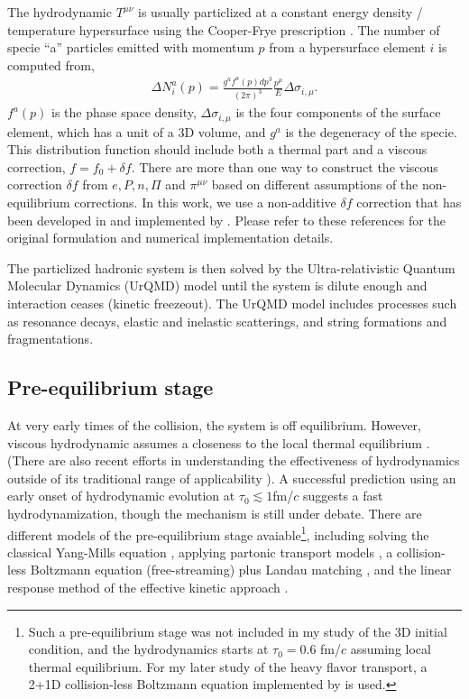 The hydrodynamic $T^{\mu\nu}$ is usually particlized at a constant energy density / temperature hypersurface using the Cooper-Frye prescription \cite{PhysRevD.10.186}.
The number of specie ``a'' particles emitted with momentum $p$ from a hypersurface element $i$ is computed from,
\begin{eqnarray}
\Delta N_i^a(p) = \frac{g^a f^a(p) dp^3}{(2\pi)^3}  \frac{p^{\mu}}{E} \Delta \sigma_{i,\mu}.
\end{eqnarray}
$f^a(p)$ is the phase space density, $\Delta \sigma_{i,\mu}$ is the four components of the surface element, which has a unit of a 3D volume, and $g^a$ is the degeneracy of the specie.
This distribution function should include both a thermal part and a viscous correction, $f = f_0 + \delta f$.
There are more than one way to construct the viscous correction $\delta f$  from $e, P, n, \Pi$ and $\pi^{\mu\nu}$ based on different assumptions of the non-equilibrium corrections.
In this work, we use a non-additive $\delta f$ correction that has been developed in \cite{Pratt:2010jt,Pratt:2014vja} and implemented by \cite{Bernhard:2018hnz}.
Please refer to these references for the original formulation and numerical implementation details.

The particlized hadronic system is then solved by the Ultra-relativistic Quantum Molecular Dynamics (UrQMD) model \cite{Bass:1998ca,Bleicher:1999xi} until the system is dilute enough and interaction ceases (kinetic freezeout). 
The UrQMD model includes processes such as resonance decays, elastic and inelastic scatterings, and string formations and fragmentations.

\subsection{Pre-equilibrium stage}
At very early times of the collision, the system is off equilibrium. 
However, viscous hydrodynamic assumes a closeness to the local thermal equilibrium . (There are also recent efforts in understanding the effectiveness of hydrodynamics outside of its traditional range of applicability \cite{PhysRevLett.115.072501,Romatschke:2017vte,Strickland:2019jut}).
A successful prediction using an early onset of hydrodynamic evolution at $\tau_0\lesssim 1$fm/$c$ suggests a fast hydrodynamization, though the mechanism is still under debate. 
There are different models of the pre-equilibrium stage avaiable\footnote{\singlespacing  Such a pre-equilibrium stage was not included in my study of the 3D initial condition, and the hydrodynamics starts at $\tau_0 = 0.6$ fm/$c$ assuming local thermal equilibrium. For my later study of the heavy flavor transport, a 2+1D collision-less Boltzmann equation implemented by \cite{Bernhard:2018hnz} is used.}, including solving the classical Yang-Mills equation \cite{Schenke:2012wb,Schenke:2016ksl}, applying partonic transport models \cite{PhysRevC.97.034915}, a collision-less Boltzmann equation (free-streaming) plus Landau matching \cite{Liu:2015nwa}, and the linear response method of the effective kinetic approach \cite{Kurkela:2018wud}.

